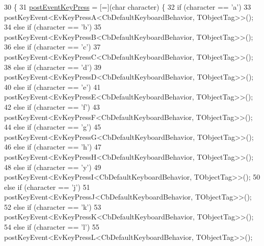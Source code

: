 \begin{DoxyCode}
30     \{
31         \hyperlink{classkeyboard__client_1_1CbDefaultKeyboardBehavior_ac3a5e8c2cca0fd4117ddc192858d3771}{postEventKeyPress} = [=](\textcolor{keywordtype}{char} character) \{
32             \textcolor{keywordflow}{if} (character == \textcolor{charliteral}{'a'})
33                 postKeyEvent<EvKeyPressA<CbDefaultKeyboardBehavior, TObjectTag>>();
34             \textcolor{keywordflow}{else} \textcolor{keywordflow}{if} (character == \textcolor{charliteral}{'b'})
35                 postKeyEvent<EvKeyPressB<CbDefaultKeyboardBehavior, TObjectTag>>();
36             \textcolor{keywordflow}{else} \textcolor{keywordflow}{if} (character == \textcolor{charliteral}{'c'})
37                 postKeyEvent<EvKeyPressC<CbDefaultKeyboardBehavior, TObjectTag>>();
38             \textcolor{keywordflow}{else} \textcolor{keywordflow}{if} (character == \textcolor{charliteral}{'d'})
39                 postKeyEvent<EvKeyPressD<CbDefaultKeyboardBehavior, TObjectTag>>();
40             \textcolor{keywordflow}{else} \textcolor{keywordflow}{if} (character == \textcolor{charliteral}{'e'})
41                 postKeyEvent<EvKeyPressE<CbDefaultKeyboardBehavior, TObjectTag>>();
42             \textcolor{keywordflow}{else} \textcolor{keywordflow}{if} (character == \textcolor{charliteral}{'f'})
43                 postKeyEvent<EvKeyPressF<CbDefaultKeyboardBehavior, TObjectTag>>();
44             \textcolor{keywordflow}{else} \textcolor{keywordflow}{if} (character == \textcolor{charliteral}{'g'})
45                 postKeyEvent<EvKeyPressG<CbDefaultKeyboardBehavior, TObjectTag>>();
46             \textcolor{keywordflow}{else} \textcolor{keywordflow}{if} (character == \textcolor{charliteral}{'h'})
47                 postKeyEvent<EvKeyPressH<CbDefaultKeyboardBehavior, TObjectTag>>();
48             \textcolor{keywordflow}{else} \textcolor{keywordflow}{if} (character == \textcolor{charliteral}{'y'})
49                 postKeyEvent<EvKeyPressI<CbDefaultKeyboardBehavior, TObjectTag>>();
50             \textcolor{keywordflow}{else} \textcolor{keywordflow}{if} (character == \textcolor{charliteral}{'j'})
51                 postKeyEvent<EvKeyPressJ<CbDefaultKeyboardBehavior, TObjectTag>>();
52             \textcolor{keywordflow}{else} \textcolor{keywordflow}{if} (character == \textcolor{charliteral}{'k'})
53                 postKeyEvent<EvKeyPressK<CbDefaultKeyboardBehavior, TObjectTag>>();
54             \textcolor{keywordflow}{else} \textcolor{keywordflow}{if} (character == \textcolor{charliteral}{'l'})
55                 postKeyEvent<EvKeyPressL<CbDefaultKeyboardBehavior, TObjectTag>>();

\end{DoxyCode}
